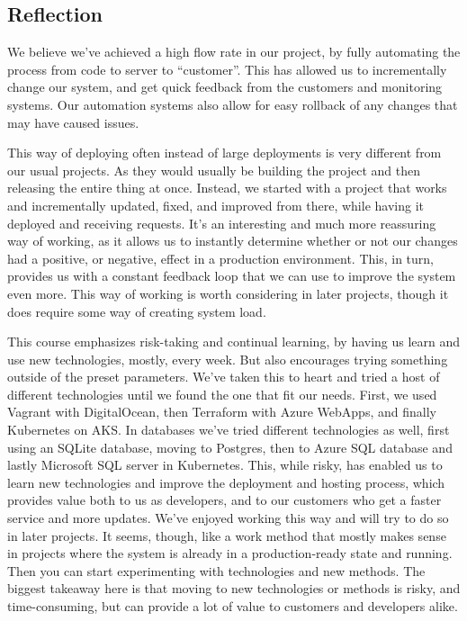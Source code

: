 \subsection{Reflection}
We believe we've achieved a high flow rate in our project, by fully automating the process from code to server to ``customer''.
This has allowed us to incrementally change our system, and get quick feedback from the customers and monitoring systems.
Our automation systems also allow for easy rollback of any changes that may have caused issues.

This way of deploying often instead of large deployments is very different from our usual projects. As they would usually be building the project and then releasing the entire thing at once.
Instead, we started with a project that works and incrementally updated, fixed, and improved from there, while having it deployed and receiving requests.
It's an interesting and much more reassuring way of working, as it allows us to instantly determine whether or not our changes had a positive, or negative, effect in a production environment.
This, in turn, provides us with a constant feedback loop that we can use to improve the system even more.
This way of working is worth considering in later projects, though it does require some way of creating system load.

This course emphasizes risk-taking and continual learning, by having us learn and use new technologies, mostly, every week.
But also encourages trying something outside of the preset parameters.
We've taken this to heart and tried a host of different technologies until we found the one that fit our needs. First, we used Vagrant with DigitalOcean, then Terraform with Azure WebApps, and finally Kubernetes on AKS.
In databases we've tried different technologies as well, first using an SQLite database, moving to Postgres, then to Azure SQL database and lastly Microsoft SQL server in Kubernetes.
This, while risky, has enabled us to learn new technologies and improve the deployment and hosting process, which provides value both to us as developers, and to our customers who get a faster service and more updates.
We've enjoyed working this way and will try to do so in later projects.
It seems, though, like a work method that mostly makes sense in projects where the system is already in a production-ready state and running.
Then you can start experimenting with technologies and new methods.
The biggest takeaway here is that moving to new technologies or methods is risky, and time-consuming, but can provide a lot of value to customers and developers alike.

